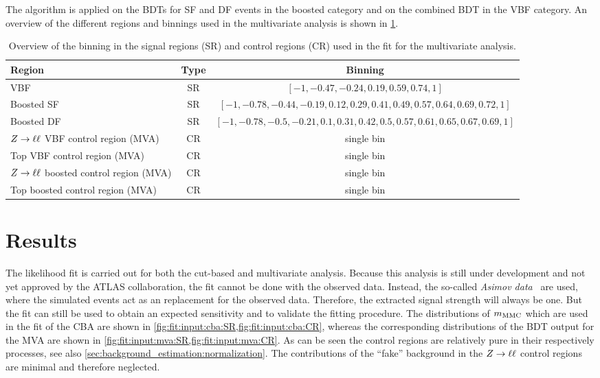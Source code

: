 The algorithm is applied on the BDTs for SF and DF events in the boosted category and on the combined BDT in the VBF category.
An overview of the different regions and binnings used in the multivariate analysis is shown in \cref{tab:fit:regions:mva}.

\begin{table}
    \centering
    \caption{Overview of the binning in the signal regions (SR) and control regions (CR) used in the fit for the multivariate analysis.}\label{tab:fit:regions:mva}
    \begin{tabular}{lcc}
        \toprule
        Region                              & Type  & Binning \\ \midrule
        VBF                                 & SR    & $\left[-1, -0.47, -0.24,  0.19, 0.59, 0.74, 1\right]$ \\
        Boosted SF                          & SR    & $\left[-1, -0.78, -0.44, -0.19, 0.12, 0.29, 0.41, 0.49, 0.57, 0.64, 0.69, 0.72, 1\right]$ \\
        Boosted DF                          & SR    & $\left[-1, -0.78, -0.5,  -0.21, 0.1,  0.31, 0.42, 0.5,  0.57, 0.61, 0.65, 0.67, 0.69, 1\right]$ \\
        $Z \to \ell \ell$ VBF control region (MVA)     & CR    & single bin\\
        Top VBF control region (MVA)        & CR    & single bin\\
        $Z \to \ell \ell$ boosted control region (MVA) & CR    & single bin\\
        Top boosted control region (MVA)    & CR    & single bin\\
    \end{tabular}
\end{table}

\section{Results}\label{sec:fit:results}

The likelihood fit is carried out for both the cut-based and multivariate analysis.
Because this analysis is still under development and not yet approved by the ATLAS collaboration, the fit cannot be done
with the observed data.
Instead, the so-called \emph{Asimov data}~\cite{FitATLAS} are used, where the simulated events act as an replacement for the observed data.
Therefore, the extracted signal strength will always be one.
But the fit can still be used to obtain an expected sensitivity and to validate the fitting procedure.
The distributions of $m_\text{MMC}$ which are used in the fit of the CBA are shown in \cref{fig:fit:input:cba:SR,fig:fit:input:cba:CR}, whereas the
corresponding distributions of the BDT output for the MVA are shown in \cref{fig:fit:input:mva:SR,fig:fit:input:mva:CR}.
As can be seen the control regions are relatively pure in their respectively processes, see also \cref{sec:background_estimation:normalization}.
The contributions of the ``fake'' background in the $Z \to \ell \ell$ control regions are minimal and therefore neglected.

